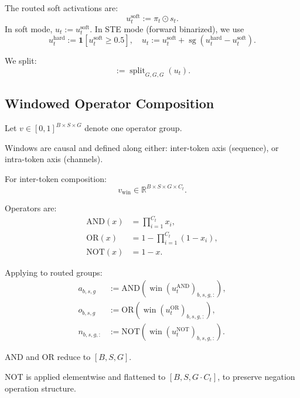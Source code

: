 \documentclass[10pt,twocolumn,letterpaper]{article}
\begin{document}
The routed soft activations are:
\begin{equation}
u_t^{\mathrm{soft}} := \pi_t \odot s_t.
\end{equation}
In soft mode, $u_t := u_t^{\mathrm{soft}}$. In STE mode (forward binarized), we use
\begin{equation}
u_t^{\mathrm{hard}} := \mathbf{1}[u_t^{\mathrm{soft}} \ge 0.5], \quad
u_t := u_t^{\mathrm{soft}} + \operatorname{sg}(u_t^{\mathrm{hard}} - u_t^{\mathrm{soft}}).
\end{equation}

We split:
\begin{equation}
[u_t^{\text{AND}}, u_t^{\text{OR}}, u_t^{\text{NOT}}] := \operatorname{split}_{G,G,G}(u_t).
\end{equation}

\subsection{Windowed Operator Composition}

Let $v \in [0,1]^{B \times S \times G}$ denote one operator group.

Windows are causal and defined along either:
inter-token axis (sequence), or intra-token axis (channels).

For inter-token composition:
\begin{equation}
v_{\text{win}} \in \mathbb{R}^{B \times S \times G \times C_t}.
\end{equation}

Operators are:
\begin{align}
\text{AND}(x) &= \prod_{i=1}^{C_t} x_i, \\
\text{OR}(x) &= 1 - \prod_{i=1}^{C_t}(1 - x_i), \\
\text{NOT}(x) &= 1 - x.
\end{align}

Applying to routed groups:
\begin{align}
a_{b,s,g} &:= \text{AND}(\operatorname{win}(u_t^{\text{AND}})_{b,s,g,:}), \\
o_{b,s,g} &:= \text{OR}(\operatorname{win}(u_t^{\text{OR}})_{b,s,g,:}), \\
n_{b,s,g,:} &:= \text{NOT}(\operatorname{win}(u_t^{\text{NOT}})_{b,s,g,:}).
\end{align}

AND and OR reduce to $[B,S,G]$.

NOT is applied elementwise and flattened to $[B,S,G \cdot C_t]$, to preserve
negation operation structure.
\end{document}
